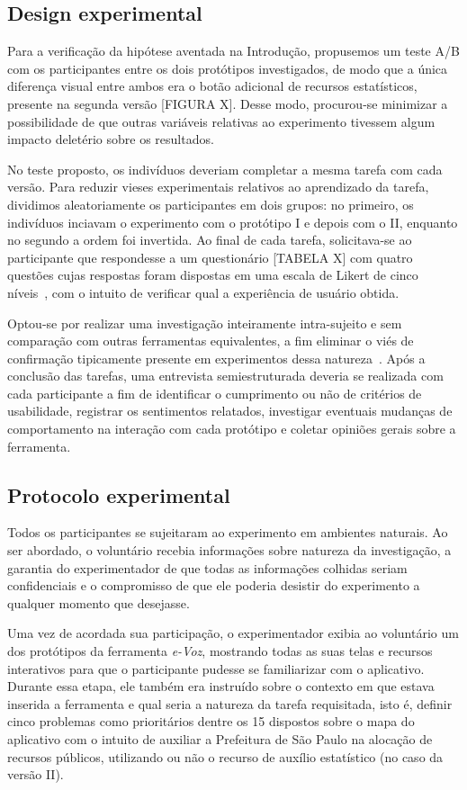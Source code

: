 \documentclass{sigchi}
\begin{document}
\subsection{Design experimental}
Para a verificação da hipótese aventada na Introdução, propusemos um teste A/B com os participantes entre os dois protótipos investigados, de modo que a única diferença visual entre ambos era o botão adicional de recursos estatísticos, presente na segunda versão [FIGURA X]. Desse modo, procurou-se minimizar a possibilidade de que outras variáveis relativas ao experimento tivessem algum impacto deletério sobre os resultados.

No teste proposto, os indivíduos deveriam completar a mesma tarefa com cada versão. Para reduzir vieses experimentais relativos ao aprendizado da tarefa, dividimos aleatoriamente os participantes em dois grupos: no primeiro, os indivíduos inciavam o experimento com o protótipo I e depois com o II, enquanto no segundo a ordem foi invertida. Ao final de cada tarefa, solicitava-se ao participante que respondesse a um questionário [TABELA X] com quatro questões cujas respostas foram dispostas em uma escala de Likert de cinco níveis~\cite{likert:1932}, com o intuito de verificar qual a experiência de usuário obtida.

Optou-se por realizar uma investigação inteiramente intra-sujeito e sem comparação com outras ferramentas equivalentes, a fim eliminar o viés de confirmação tipicamente presente em experimentos dessa natureza~\cite{dell:2012}. Após a conclusão das tarefas, uma entrevista semiestruturada deveria se realizada com cada participante a fim de identificar o cumprimento ou não de critérios de usabilidade, registrar os sentimentos relatados, investigar eventuais mudanças de comportamento na interação com cada protótipo e coletar opiniões gerais sobre a ferramenta.

\subsection{Protocolo experimental}
Todos os participantes se sujeitaram ao experimento em ambientes naturais. Ao ser abordado, o voluntário recebia informações sobre natureza da investigação, a garantia do experimentador de que todas as informações colhidas seriam confidenciais e o compromisso de que ele poderia desistir do experimento a qualquer momento que desejasse.

Uma vez de acordada sua participação, o experimentador exibia ao voluntário um dos protótipos da ferramenta \textit{e-Voz}, mostrando todas as suas telas e recursos interativos para que o participante pudesse se familiarizar com o aplicativo. Durante essa etapa, ele também era instruído sobre o contexto em que estava inserida a ferramenta e qual seria a natureza da tarefa requisitada, isto é, definir cinco problemas como prioritários dentre os 15 dispostos sobre o mapa do aplicativo com o intuito de auxiliar a Prefeitura de São Paulo na alocação de recursos públicos, utilizando ou não o recurso de auxílio estatístico (no caso da versão II).
\end{document}

